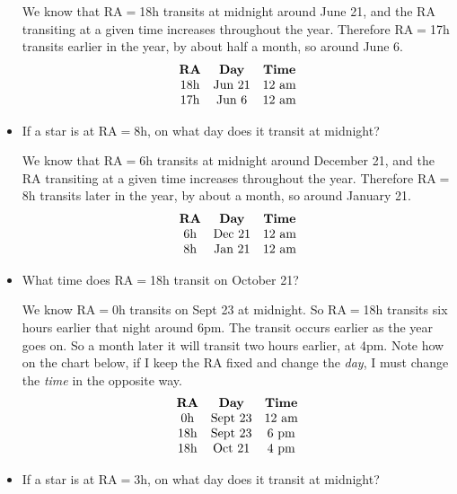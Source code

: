 \documentclass[12pt, preprint]{aastex}
\begin{document}
\begin{itemize}
  \begin{answer}
    We know that RA$=$18h transits at midnight around June 21, and the
    RA transiting at a given time increases throughout the year.
    Therefore RA$=$17h transits earlier in the year, by about half a
    month, so around June 6.
    \begin{equation}
    \begin{array}{ccc}
      \mbox{\bf RA} & \mbox{\bf Day} & \mbox{\bf Time} \cr
      \mbox{18h} & \mbox{Jun 21} & \mbox{12 am}\cr
      \mbox{17h} & \mbox{Jun 6}  & \mbox{12 am}\cr
    \end{array}
    \end{equation}
  \end{answer}
\item If a star is at RA$=$8h, on what day does it transit at midnight?

  \begin{answer}
    We know that RA$=$6h transits at midnight around December 21, and
    the RA transiting at a given time increases throughout the year.
    Therefore RA$=$8h transits later in the year, by about a month,
    so around January 21.
    \begin{equation}
    \begin{array}{ccc}
      \mbox{\bf RA} & \mbox{\bf Day} & \mbox{\bf Time} \cr
      \mbox{6h} & \mbox{Dec 21} & \mbox{12 am}\cr
      \mbox{8h} & \mbox{Jan 21}  & \mbox{12 am}\cr
    \end{array}
    \end{equation}
  \end{answer}
\item What time does RA$=$18h transit on October 21?

  \begin{answer}
    We know RA$=$0h transits on Sept 23 at midnight. So RA$=$18h
    transits six hours earlier that night around 6pm.
    The transit occurs
    earlier as the year goes on. So a month later it will transit two
    hours earlier, at 4pm. Note how on the chart below, if I keep the
    RA fixed and change the {\it day}, I must change the {\it time} in
    the opposite way.
    \begin{equation}
    \begin{array}{ccc}
      \mbox{\bf RA} & \mbox{\bf Day} & \mbox{\bf Time} \cr
      \mbox{0h} & \mbox{Sept 23} & \mbox{12 am}\cr
      \mbox{18h} & \mbox{Sept 23} & \mbox{6 pm}\cr
      \mbox{18h} & \mbox{Oct 21}  & \mbox{4 pm}\cr
    \end{array}
    \end{equation}
  \end{answer}
\item If a star is at RA$=$3h, on what day does it transit at midnight?


\end{itemize}
\end{document}

